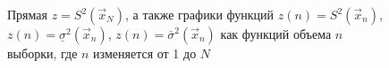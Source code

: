 \begin{figure}[!h]
 \caption{Прямая $z = S^2(\vec x_N)$, а также графики функций $z(n) = S^2(\vec x_n)$, $z(n) = \underline \sigma^2(\vec x_n)$, $z(n) = \overline \sigma^2(\vec x_n)$ как функций объема $n$ выборки, где $n$ изменяется от 1 до $N$}
\end{figure}

\newpage